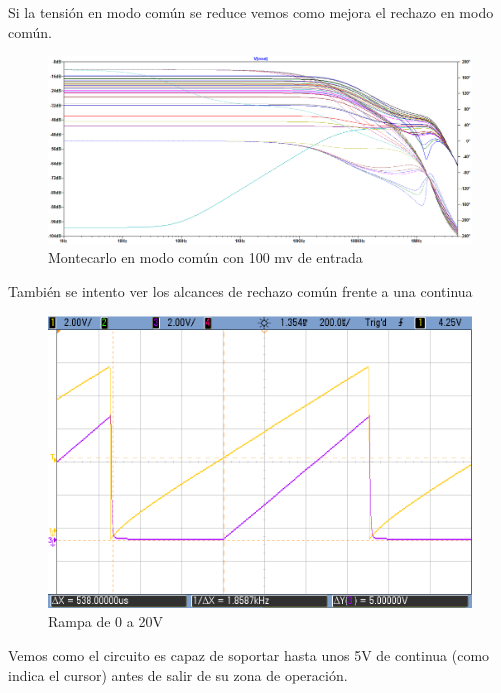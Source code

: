 Si la tensión en modo común se reduce vemos como mejora el rechazo en modo común.
\begin{figure}[H]
	\centering
	\includegraphics[height=0.3\textheight]{./ImagenesDeSimulaciones/MonteCarloModoComunGrande100mv.png}
	\caption{Montecarlo en modo común con 100 mv de entrada}
\end{figure} 

También se intento ver los alcances de rechazo común frente a una continua
\begin{figure}[H]
	\centering
	\includegraphics[height=0.3\textheight]{./ImagenesDeOsciloscopio/ModoComunContinua.png}
	\caption{Rampa de 0 a 20V}
\end{figure} 

Vemos como el circuito es capaz de soportar hasta unos 5V de continua (como indica el cursor) antes de salir de su zona de operación.

